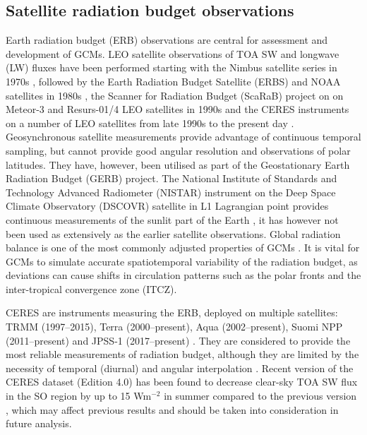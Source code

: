 \subsection{Satellite radiation budget observations}

Earth radiation budget (ERB) observations are central for assessment and development
of GCMs. LEO satellite observations of TOA SW and longwave (LW) fluxes
have been performed starting with the Nimbus satellite series in 1970s
\citep{smith1977}, followed by the Earth Radiation Budget Satellite (ERBS) and NOAA
satellites in 1980s \citep{barkstrom1984}, the Scanner for Radiation Budget (ScaRaB)
project on on Meteor-3 and Resurs-01/4 LEO satellites in 1990s \citep{kandel1994}
and the
CERES instruments on a number of LEO satellites from late 1990s
to the present day \citep{wielicki1996}. Geosynchronous satellite measurements
provide advantage of continuous temporal sampling, but cannot provide
good angular resolution and observations of polar latitudes. They have,
however, been utilised as part of the Geostationary Earth Radiation Budget (GERB)
project.
The National Institute of Standards and Technology Advanced Radiometer (NISTAR)
instrument on the Deep Space Climate Observatory (DSCOVR) satellite in L1 Lagrangian point provides continuous
measurements of the sunlit part of the Earth \citep{khlopenkov2017}, it has however not been used
as extensively as the earlier satellite observations. Global radiation balance
is one of the most commonly adjusted properties of GCMs
\citep{hourdin2017,schmidt2017}. It is vital for GCMs to simulate accurate
spatiotemporal variability of the radiation budget, as deviations can cause
shifts in circulation patterns such as the polar fronts and
the inter-tropical convergence zone (ITCZ).

CERES are instruments measuring the ERB,
deployed on multiple satellites:
TRMM (1997--2015), Terra (2000--present), Aqua (2002--present), Suomi NPP (2011--present) and JPSS-1
(2017--present) \citep{damadeo2017}. They are
considered to provide the most reliable measurements of radiation budget,
although they are limited by the necessity of temporal (diurnal) and angular
interpolation \citep{smith2011}.
Recent version of the CERES dataset (Edition 4.0) has been found to decrease
clear-sky TOA SW flux in the SO region by up to 15 Wm$^{-2}$
in summer compared to the previous version \citep{loeb2017},
which may affect previous results and should be taken into consideration in
future analysis.

